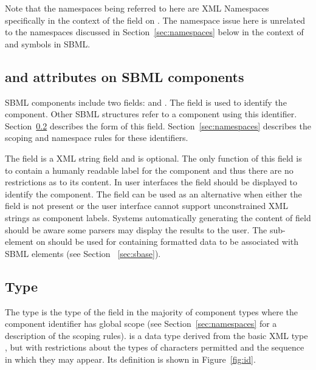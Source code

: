 \documentclass[10pt]{cekarticle}
\newcommand{\vref}[1]{\ref{#1}}
\begin{document}
Note that the namespaces being referred to here are XML Namespaces
specifically in the context of the  field on
.  The namespace issue here is unrelated to the namespaces
discussed in Section~\ref{sec:namespaces} below in the context of
 and symbols in SBML.

\subsection{ and  attributes on SBML components}

\label{sec:idnameattribs}

SBML components include two fields:  and .
The  field is used to identify the component.  Other
SBML structures refer to a component using this identifier.
Section~\ref{sec:id} describes the form of this field.
Section~\ref{sec:namespaces} describes the scoping and namespace
rules for these identifiers.

The  field is a XML string field and is optional. The
only function of this field is to contain a humanly readable label
for the component and thus there are no restrictions as to its
content.  In user interfaces the  field should be
displayed to identify the component.  The  field can be
used as an alternative when either the  field is not
present or the user interface cannot support unconstrained XML
strings as component labels.  Systems automatically generating the
content of  field should be aware some parsers may
display the results to the user.  The  sub-element
on  should be used for containing formatted data to
be associated with SBML elements (see Section ~\ref{sec:sbase}).

\subsection{Type }
\label{sec:id}

The type  is the type of the  field in the
majority of component types where the component identifier has
global scope (see Section~\ref{sec:namespaces} for a description
of the scoping rules).  is a data type derived from the
basic XML type , but with restrictions about the
types of characters permitted and the sequence in which they may
appear. Its definition is shown in Figure~\vref{fig:id}.
\end{document}
